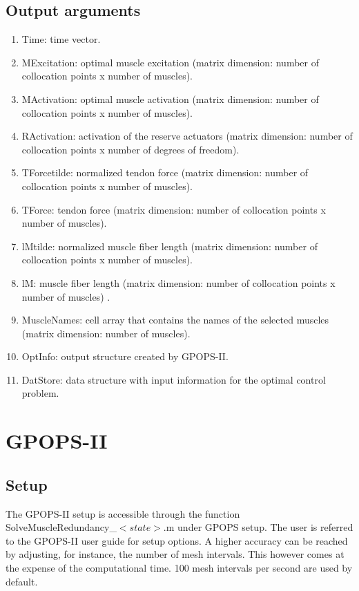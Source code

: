 \documentclass[a4paper,oneside,11pt]{article}
\begin{document}
\subsection{Output arguments}


\begin{enumerate}
	\item Time: time vector.
	\item MExcitation: optimal muscle excitation (matrix dimension: number of collocation points x number of muscles).
	\item MActivation: optimal muscle activation (matrix dimension: number of collocation points x number of muscles).
	\item RActivation: activation of the reserve actuators (matrix dimension: number of collocation points x number of degrees of freedom).
	\item TForcetilde: normalized tendon force (matrix dimension: number of collocation points x number of muscles).
	\item TForce: tendon force (matrix dimension: number of collocation points x number of muscles).
	\item lMtilde: normalized muscle fiber length (matrix dimension: number of collocation points x number of muscles).
	\item lM:  muscle fiber length (matrix dimension: number of collocation points x number of muscles)	.
	\item MuscleNames: cell array that contains the names of the selected muscles (matrix dimension: number of muscles).
	\item OptInfo: output structure created by GPOPS-II.
	\item DatStore: data structure with input information for the optimal control problem.
\end{enumerate}

\section{GPOPS-II}
\subsection{Setup}

The GPOPS-II setup is accessible through the function SolveMuscleRedundancy_$<state>$.m under GPOPS setup. The user is referred to the GPOPS-II user guide for setup options. A higher accuracy can be reached by adjusting, for instance, the number of mesh intervals. This however comes at the expense of the computational time. 100 mesh intervals per second are used by default.
\end{document}
